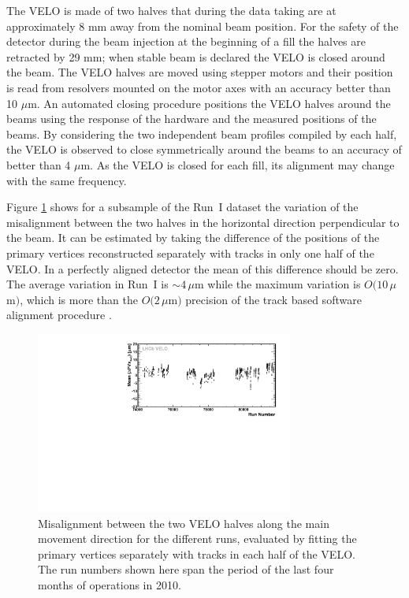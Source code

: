 The VELO is made of two halves that during the data taking are at approximately
8 mm away from the nominal beam position. For the safety of the detector during
the beam injection at the beginning of a fill the halves are retracted by 29 mm;
when stable beam is declared the VELO is closed around the beam.
The VELO halves are moved using stepper motors and their position is read from
resolvers mounted on the motor axes with an accuracy better than 10 $\mu$m.  An
automated closing procedure positions the VELO halves around the beams using the
response of the hardware and the measured positions of the beams.  By
considering the two independent beam profiles compiled by each half, the VELO is
observed to close symmetrically around the beams to an accuracy of better than 4
$\mu$m.  As the VELO is closed for each fill, its alignment may change with the
same frequency.

Figure \ref{fig:alignStability} shows for a subsample of the Run~I dataset the
variation of the misalignment between the two halves in the horizontal direction
perpendicular to the beam. It can be estimated by taking the difference of the
positions of the primary vertices reconstructed separately with tracks in only
one half of the VELO. In a perfectly aligned detector the mean of this
difference should be zero. The average variation in Run~I is $\sim 4\,\mu$m
while the maximum variation is $O(10\,\mu$m$)$, which is more than the
$O(2\,\mu$m$)$ precision of the track based software alignment procedure
\cite{LHCb-DP-2014-001}.

\begin{figure}[h]
\includegraphics[width=20pc]{../figures/alignStability}\hspace{2pc}%
\begin{minipage}[b]{14pc}\caption{\label{fig:alignStability}
    Misalignment 
    between the two VELO halves along the main movement direction
    for the different runs, evaluated by fitting the primary
    vertices separately with tracks in each half of the VELO. 
The run numbers shown here span the period of the last four months of operations in 2010.}
\end{minipage}
\end{figure}

